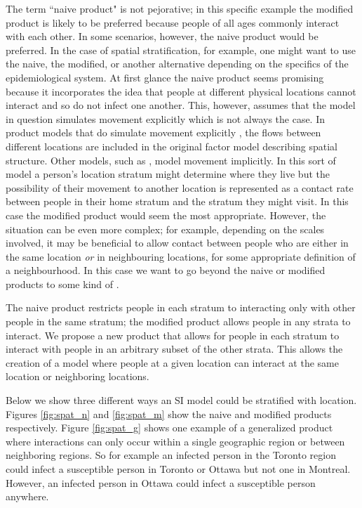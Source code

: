 The term “naive product" is not pejorative; in this specific example the modified product is likely to be preferred because people of all ages commonly interact with each other. In some scenarios, however, the naive product would be preferred. In the case of spatial stratification, for example, one might want to use the naive, the modified, or another alternative depending on the specifics of the epidemiological system. At first glance the naive product seems promising because it incorporates the idea that people at different physical locations cannot interact and so do not infect one another. This, however, assumes that the model in question simulates movement explicitly which is not always the case. In product models that do simulate movement explicitly \cite[e.g.][]{mohammadi2023importation}, the flows between different locations are included in the original factor model describing spatial structure. Other models, such as \cite{dietz1995structured}, model movement implicitly. In this sort of model a person's location stratum might determine where they live but the possibility of their movement to another location is represented as a contact rate between people in their home stratum and the stratum they might visit. In this case the modified product would seem the most appropriate. However, the situation can be even more complex; for example, depending on the scales involved, it may be beneficial to allow contact between people who are either in the same location \emph{or} in neighbouring locations, for some appropriate definition of a neighbourhood. In this case we want to go beyond the naive or modified products to some kind of .


The naive product restricts people in each stratum to interacting only with other people in the same stratum; the modified product allows people in any strata to interact. We propose a new product that allows for people in each stratum to interact with people in an arbitrary subset of the other strata. This allows the creation of a model where people at a given location can interact at the same location or neighboring locations. 



Below we show three different ways an SI model could be stratified with location. Figures \ref{fig:spat_n} and \ref{fig:spat_m} show the naive and modified products respectively. Figure \ref{fig:spat_g} shows one example of a generalized product where interactions can only occur within a single geographic region or between neighboring regions. So for example an infected person in the Toronto region could infect a susceptible person in Toronto or Ottawa but not one in Montreal. However, an infected person in Ottawa could infect a susceptible person anywhere. 

